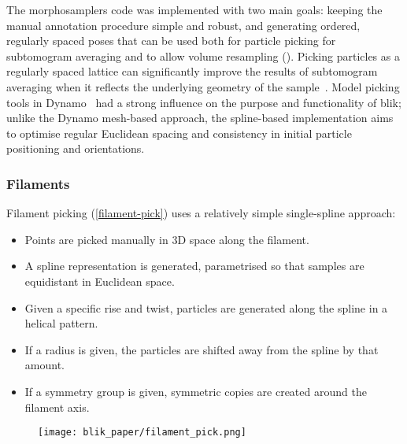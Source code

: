 The morphosamplers code was implemented with two main goals: keeping the manual annotation procedure simple and robust, and generating ordered, regularly spaced poses that can be used both for particle picking for subtomogram averaging and to allow volume resampling (). Picking particles as a regularly spaced lattice can significantly improve the results of subtomogram averaging when it reflects the underlying geometry of the sample~\cite{castano-diezDynamoCatalogueGeometrical2017,burtFlexibleFrameworkMultiparticle2021}. Model picking tools in Dynamo~\cite{castano-diezDynamoFlexibleUserfriendly2012} had a strong influence on the purpose and functionality of blik; unlike the Dynamo mesh-based approach, the spline-based implementation aims to optimise regular Euclidean spacing and consistency in initial particle positioning and orientations.

\subsubsection{Filaments}
Filament picking (\autoref{filament-pick}) uses a relatively simple single-spline approach:

\begin{itemize}[noitemsep]
    \item Points are picked manually in 3D space along the filament.
    \item A spline representation is generated, parametrised so that samples are equidistant in Euclidean space.
    \item Given a specific rise and twist, particles are generated along the spline in a helical pattern.
    \item If a radius is given, the particles are shifted away from the spline by that amount.
    \item If a symmetry group is given, symmetric copies are created around the filament axis.
\end{itemize}

\begin{figure}[!ht]
    \centering
    \texttt{[image: blik\_paper/filament\_pick.png]}
    \label{filament-pick}
\end{figure}

